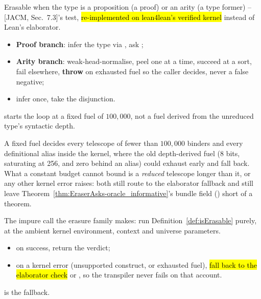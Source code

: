 \begin{definition}
\label{def:isErasable}
\leanok
{} Erasable when the type is a proposition (a proof) or an arity (a type former) --
[JACM, Sec.~7.3]'s test, \hl{re-implemented on lean4lean's verified kernel} instead of Lean's
elaborator.
\begin{itemize}
\item \textbf{Proof branch}: infer the type via , ask ;
\item \textbf{Arity branch}: weak-head-normalise, peel one  at a time, succeed at a
sort, fail elsewhere, \textbf{throw} on exhausted fuel so the caller decides, never a false
negative;
\item infer once, take the disjunction.
\end{itemize}
  starts the loop at a fixed fuel of $100{,}000$, not a fuel derived
from the unreduced type's syntactic depth.
\end{definition}

\begin{remark}
 A fixed fuel decides every telescope of fewer than $100{,}000$ binders and every
definitional alias inside the kernel, where the old depth-derived fuel (8 bits, saturating at
256, and zero behind an  alias) could exhaust early and fall back. What a
constant budget cannot bound is a \emph{reduced} telescope longer than it, or any other kernel
error  raises: both still route to the elaborator fallback and still leave
Theorem~\ref{thm:EraserAsks-oracle_informative}'s bundle field
() short of a theorem.
\end{remark}

\begin{definition}
\label{def:Erasure-isErasable}
\leanok
{} The impure call the erasure family makes: run Definition~\ref{def:isErasable}
purely, at the ambient kernel environment, context and universe parameters.
\begin{itemize}
\item on success, return the verdict;
\item on a kernel error (unsupported construct, or exhausted fuel), \hl{fall back to the
elaborator check}  or , so the transpiler never
fails on that account.
\end{itemize}
  is the fallback.
\end{definition}

